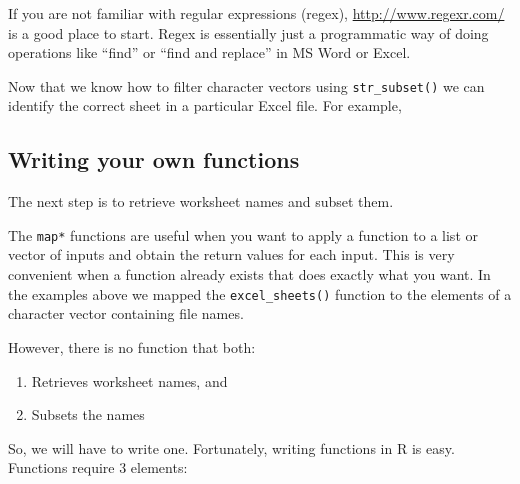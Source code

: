 \documentclass[]{book}
\newenvironment{Shaded}{\begin{snugshade}}{\end{snugshade}}
\newcommand{\CommentTok}[1]{\textcolor[rgb]{0.56,0.35,0.01}{\textit{#1}}}
\newcommand{\DataTypeTok}[1]{\textcolor[rgb]{0.13,0.29,0.53}{#1}}
\newcommand{\DecValTok}[1]{\textcolor[rgb]{0.00,0.00,0.81}{#1}}
\newcommand{\KeywordTok}[1]{\textcolor[rgb]{0.13,0.29,0.53}{\textbf{#1}}}
\newcommand{\NormalTok}[1]{#1}
\newcommand{\OperatorTok}[1]{\textcolor[rgb]{0.81,0.36,0.00}{\textbf{#1}}}
\newcommand{\StringTok}[1]{\textcolor[rgb]{0.31,0.60,0.02}{#1}}
\providecommand{\tightlist}{%
  \setlength{\itemsep}{0pt}\setlength{\parskip}{0pt}}
\begin{document}
If you are not familiar with regular expressions (regex),
\url{http://www.regexr.com/} is a good place to start. Regex is essentially
just a programmatic way of doing operations like ``find'' or ``find and replace''
in MS Word or Excel.

Now that we know how to filter character vectors using \texttt{str\_subset()} we can
identify the correct sheet in a particular Excel file. For example,

\begin{Shaded}
\end{Shaded}

\hypertarget{writing-your-own-functions}{%
\subsection{Writing your own functions}\label{writing-your-own-functions}}

The next step is to retrieve worksheet names and subset them.

The \texttt{map*} functions are useful when you want to apply a function to a
list or vector of inputs and obtain the return values for each input. This
is very convenient when a function already exists that does exactly what you
want. In the examples above we mapped the \texttt{excel\_sheets()} function to
the elements of a character vector containing file names.

However, there is no function that both:

\begin{enumerate}
\def\labelenumi{\arabic{enumi}.}
\tightlist
\item
  Retrieves worksheet names, and
\item
  Subsets the names
\end{enumerate}

So, we will have to write one. Fortunately, writing functions in R is easy.
Functions require 3 elements:
\end{document}

